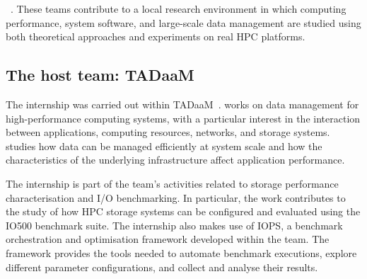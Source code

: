 ~\cite{inria_hpc_teams}. These teams contribute to a local
research environment in which computing performance, system software, and
large-scale data management are studied using both theoretical approaches
and experiments on real HPC platforms.



\subsection{The host team: TADaaM}

The internship was carried out within TADaaM~\cite{inria_tadaam}.  works on data
management for high-performance computing systems, with a particular
interest in the interaction between applications, computing resources,
networks, and storage systems.  studies how data can be managed
efficiently at system scale and how the characteristics of the underlying
infrastructure affect application performance.

The internship is part of the team's activities related to storage
performance characterisation and I/O benchmarking. In particular, the
work contributes to the study of how HPC storage systems can be configured
and evaluated using the IO500 benchmark suite\cite{io500about}. The internship also makes
use of IOPS\cite{iops}, a benchmark orchestration and optimisation framework
developed within the team. The framework provides the tools
needed to automate benchmark executions, explore different parameter
configurations, and collect and analyse their results.

